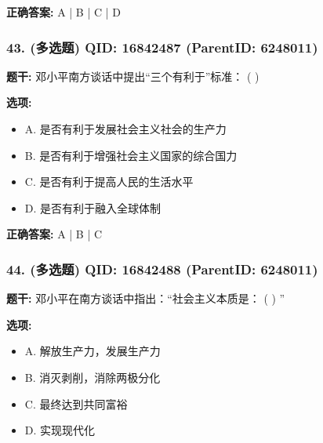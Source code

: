 \documentclass[12pt,UTF8]{ctexart}
\begin{document}
\textbf{正确答案:}
A | B | C | D

\vspace{0.3em}\hrulefill\vspace{0.7em}

\subsubsection*{43. (多选题) \small QID: 16842487 (ParentID: 6248011)}

\textbf{题干:}
邓小平南方谈话中提出“三个有利于”标准： ( )



\textbf{选项:}
\begin{itemize}[leftmargin=*]

  \item A. 是否有利于发展社会主义社会的生产力

  \item B. 是否有利于增强社会主义国家的综合国力

  \item C. 是否有利于提高人民的生活水平

  \item D. 是否有利于融入全球体制

\end{itemize}

\textbf{正确答案:}
A | B | C

\vspace{0.3em}\hrulefill\vspace{0.7em}

\subsubsection*{44. (多选题) \small QID: 16842488 (ParentID: 6248011)}

\textbf{题干:}
邓小平在南方谈话中指出：“社会主义本质是： ( ) ”



\textbf{选项:}
\begin{itemize}[leftmargin=*]

  \item A. 解放生产力，发展生产力

  \item B. 消灭剥削，消除两极分化

  \item C. 最终达到共同富裕

  \item D. 实现现代化

\end{itemize}
\end{document}
